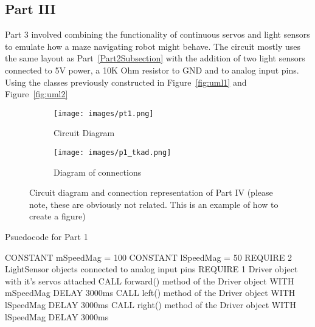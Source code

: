 \documentclass[journal]{IEEEtran}
\begin{document}
\subsection{Part III} \label{Part3Subsection}
Part 3 involved combining the functionality of continuous servos and light sensors to emulate how a maze navigating robot might behave. The circuit mostly uses the same layout as Part~\ref{Part2Subsection} with the addition of two light sensors connected to 5V power, a 10K Ohm resistor to GND and to analog input pins. Using the classes previously constructed in Figure~\ref{fig:uml1} and Figure~\ref{fig:uml2}

\begin{figure}[ht]
    \centering
      \begin{subfigure}[b]{0.2\textwidth}
         \centering
         \texttt{[image: images/pt1.png]} 
         \caption{Circuit Diagram}
         \label{fig:Circuit_diagram3}
     \end{subfigure}
     \begin{subfigure}[b]{0.2\textwidth}
         \centering
         \texttt{[image: images/p1\_tkad.png]} 
         \caption{Diagram of connections}
         \label{fig:connections3}
     \end{subfigure}  \hfill
    \caption{Circuit diagram and connection representation of Part IV (please note, these are obviously not related. This is an example of how to create a figure)}
    \label{fig:part3}
\end{figure}


\begin{algorithm}
\caption{Psuedocode for Part 1}\label{alg:part1}
\begin{algorithmic}[1]
\State CONSTANT mSpeedMag = 100
\State CONSTANT lSpeedMag = 50
\State REQUIRE 2 LightSensor objects connected to analog input pins
\State REQUIRE 1 Driver object with it's servos attached
    \State CALL forward() method of the Driver object WITH mSpeedMag
    \State DELAY 3000ms
    \State CALL left() method of the Driver object WITH lSpeedMag
    \State DELAY 3000ms
    \State CALL right() method of the Driver object WITH lSpeedMag
    \State DELAY 3000ms
\EndIf
\EndWhile
\end{algorithmic}
\end{algorithm}
\end{document}
